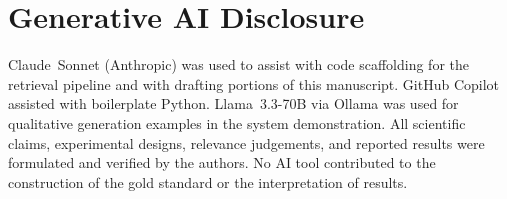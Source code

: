 \documentclass[sigconf,screen]{acmart}
\begin{document}
\section{Generative AI Disclosure}
\label{sec:ai-disclosure}

Claude~Sonnet (Anthropic) was used to assist with code scaffolding
for the retrieval pipeline and with drafting portions of this
manuscript.  GitHub Copilot assisted with boilerplate Python.
Llama~3.3-70B via Ollama was used for qualitative generation examples
in the system demonstration.  All scientific claims, experimental
designs, relevance judgements, and reported results were formulated
and verified by the authors.  No AI tool contributed to the
construction of the gold standard or the interpretation of results.
\end{document}
